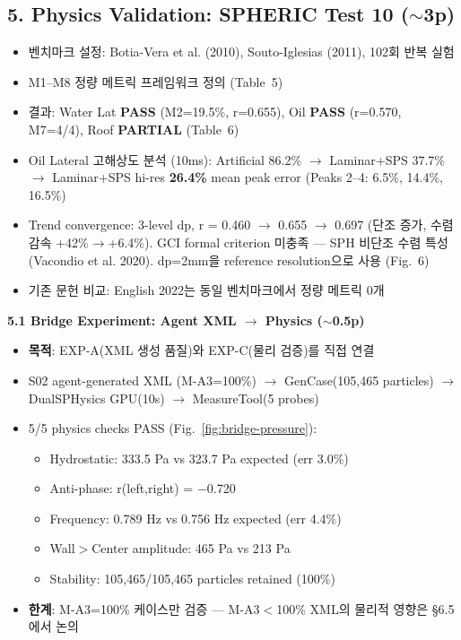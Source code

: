\documentclass[11pt,a4paper]{article}
\begin{document}
\subsection{5. Physics Validation: SPHERIC Test 10 ({\small\color{gray}$\sim$3p})}
\begin{itemize}[nosep,leftmargin=1.5em]
\item 벤치마크 설정: Botia-Vera et al. (2010), Souto-Iglesias (2011), 102회 반복 실험
\item M1--M8 정량 메트릭 프레임워크 정의 (Table~5)
\item 결과: Water Lat \textbf{PASS} (M2=19.5\%, r=0.655), Oil \textbf{PASS} (r=0.570, M7=4/4), Roof \textbf{PARTIAL} (Table~6)
\item Oil Lateral 고해상도 분석 (10ms): Artificial 86.2\% $\rightarrow$ Laminar+SPS 37.7\% $\rightarrow$ Laminar+SPS hi-res \textbf{26.4\%} mean peak error (Peaks 2--4: 6.5\%, 14.4\%, 16.5\%)
\item Trend convergence: 3-level dp, r = 0.460 $\rightarrow$ 0.655 $\rightarrow$ 0.697 (단조 증가, 수렴 감속 +42\%$\rightarrow$+6.4\%). GCI formal criterion 미충족 --- SPH 비단조 수렴 특성 (Vacondio et al. 2020). dp=2mm을 reference resolution으로 사용 (Fig.~6)
\item 기존 문헌 비교: English 2022는 동일 벤치마크에서 정량 메트릭 0개
\end{itemize}

\textbf{5.1 Bridge Experiment: Agent XML $\rightarrow$ Physics ({\small\color{gray}$\sim$0.5p})}
\begin{itemize}[nosep,leftmargin=1.5em]
\item \textbf{목적}: EXP-A(XML 생성 품질)와 EXP-C(물리 검증)를 직접 연결
\item S02 agent-generated XML (M-A3=100\%) $\rightarrow$ GenCase(105,465 particles) $\rightarrow$ DualSPHysics GPU(10s) $\rightarrow$ MeasureTool(5 probes)
\item 5/5 physics checks PASS (Fig.~\ref{fig:bridge-pressure}):
  \begin{itemize}[nosep,leftmargin=1em]
  \item Hydrostatic: 333.5 Pa vs 323.7 Pa expected (err 3.0\%)
  \item Anti-phase: r(left,right) = $-$0.720
  \item Frequency: 0.789 Hz vs 0.756 Hz expected (err 4.4\%)
  \item Wall$>$Center amplitude: 465 Pa vs 213 Pa
  \item Stability: 105,465/105,465 particles retained (100\%)
  \end{itemize}
\item \textbf{한계}: M-A3=100\% 케이스만 검증 --- M-A3$<$100\% XML의 물리적 영향은 §6.5에서 논의
\end{itemize}
\end{document}
